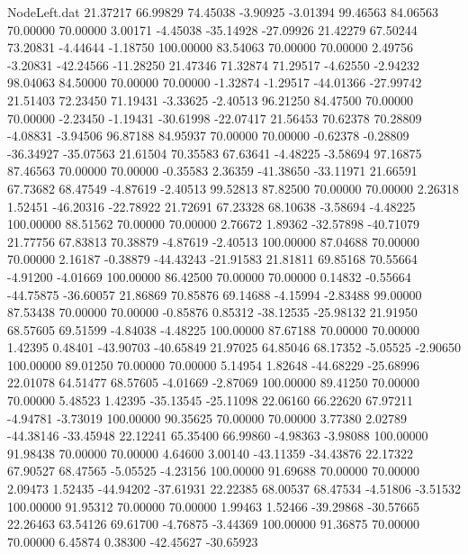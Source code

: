 \begin{filecontents}{NodeLeft.dat}
  21.37217   66.99829   74.45038    -3.90925   -3.01394   99.46563   84.06563   70.00000   70.00000    3.00171   -4.45038  -35.14928  -27.09926
  21.42279   67.50244   73.20831    -4.44644   -1.18750  100.00000   83.54063   70.00000   70.00000    2.49756   -3.20831  -42.24566  -11.28250
  21.47346   71.32874   71.29517    -4.62550   -2.94232   98.04063   84.50000   70.00000   70.00000   -1.32874   -1.29517  -44.01366  -27.99742
  21.51403   72.23450   71.19431    -3.33625   -2.40513   96.21250   84.47500   70.00000   70.00000   -2.23450   -1.19431  -30.61998  -22.07417
  21.56453   70.62378   70.28809    -4.08831   -3.94506   96.87188   84.95937   70.00000   70.00000   -0.62378   -0.28809  -36.34927  -35.07563
  21.61504   70.35583   67.63641    -4.48225   -3.58694   97.16875   87.46563   70.00000   70.00000   -0.35583    2.36359  -41.38650  -33.11971
  21.66591   67.73682   68.47549    -4.87619   -2.40513   99.52813   87.82500   70.00000   70.00000    2.26318    1.52451  -46.20316  -22.78922
  21.72691   67.23328   68.10638    -3.58694   -4.48225  100.00000   88.51562   70.00000   70.00000    2.76672    1.89362  -32.57898  -40.71079
  21.77756   67.83813   70.38879    -4.87619   -2.40513  100.00000   87.04688   70.00000   70.00000    2.16187   -0.38879  -44.43243  -21.91583
  21.81811   69.85168   70.55664    -4.91200   -4.01669  100.00000   86.42500   70.00000   70.00000    0.14832   -0.55664  -44.75875  -36.60057
  21.86869   70.85876   69.14688    -4.15994   -2.83488   99.00000   87.53438   70.00000   70.00000   -0.85876    0.85312  -38.12535  -25.98132
  21.91950   68.57605   69.51599    -4.84038   -4.48225  100.00000   87.67188   70.00000   70.00000    1.42395    0.48401  -43.90703  -40.65849
  21.97025   64.85046   68.17352    -5.05525   -2.90650  100.00000   89.01250   70.00000   70.00000    5.14954    1.82648  -44.68229  -25.68996
  22.01078   64.51477   68.57605    -4.01669   -2.87069  100.00000   89.41250   70.00000   70.00000    5.48523    1.42395  -35.13545  -25.11098
  22.06160   66.22620   67.97211    -4.94781   -3.73019  100.00000   90.35625   70.00000   70.00000    3.77380    2.02789  -44.38146  -33.45948
  22.12241   65.35400   66.99860    -4.98363   -3.98088  100.00000   91.98438   70.00000   70.00000    4.64600    3.00140  -43.11359  -34.43876
  22.17322   67.90527   68.47565    -5.05525   -4.23156  100.00000   91.69688   70.00000   70.00000    2.09473    1.52435  -44.94202  -37.61931
  22.22385   68.00537   68.47534    -4.51806   -3.51532  100.00000   91.95312   70.00000   70.00000    1.99463    1.52466  -39.29868  -30.57665
  22.26463   63.54126   69.61700    -4.76875   -3.44369  100.00000   91.36875   70.00000   70.00000    6.45874    0.38300  -42.45627  -30.65923

\end{filecontents}
